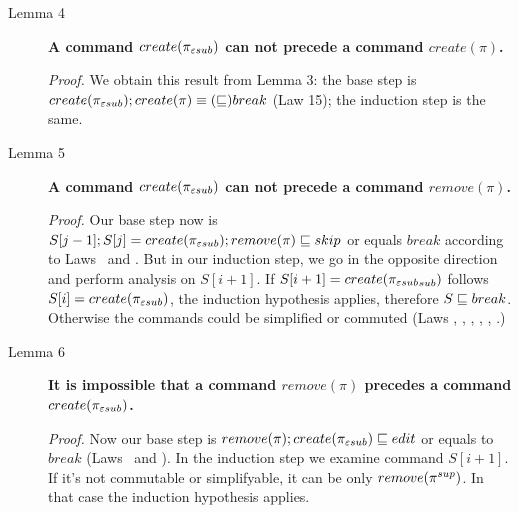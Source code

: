 \begin{description}
\item[Lemma 4]
{\bf A command \(create(\pi_{\varepsilon sub})\) can not precede a command
\(create(\pi)\).} 
\begin{notrsi}
\emph{Proof.} 
We obtain this result from Lemma 3: the base step is 
\(create(\pi_{\varepsilon sub}); create({\pi}) \equiv (\sqsubseteq) break\) (Law 15); the
induction step is the same.
\end{notrsi}

\item[Lemma 5]
{\bf A command \(create(\pi_{\varepsilon sub})\) can not precede a command
\(remove(\pi)\).} 
\begin{notrsi}
\emph{Proof.} 
Our base step now is 
\(S[j-1];S[j]=create({\pi_{\varepsilon sub}}); remove(\pi)\sqsubseteq skip\) or equals
\(break\) according to Laws \lawxxvii~and \lawxvii.
But in our induction step, we go in the opposite direction and perform
analysis on \(S[i+1]\).
If \(S[i+1]=create({\pi_{\varepsilon sub}}_{sub})\) follows \(S[i]=create(\pi_{\varepsilon sub})\),
the induction hypothesis applies, therefore \(S\sqsubseteq break\). Otherwise
the commands could be simplified or commuted (Laws \lawxviii, \lawxiv,
\lawxv, \lawxvi, \lawxvii, \lawxxvii.)
\end{notrsi}

\item[Lemma 6] 
{\bf It is impossible that a command \(remove(\pi)\)
precedes a command \(create(\pi_{\varepsilon sub})\).} 
\begin{notrsi}
\emph{Proof.} 
Now our base step is
\(remove(\pi); create(\pi_{\varepsilon sub})\sqsubseteq edit\) or equals to
\(break\) (Laws \lawxxviii~and \lawxx). In the induction step we
examine command \(S[i+1]\). 
If it's not commutable or simplifyable,
it can be only \(remove(\pi^{sup})\).
In that case the induction hypothesis applies.
\end{notrsi}
\end{description}


